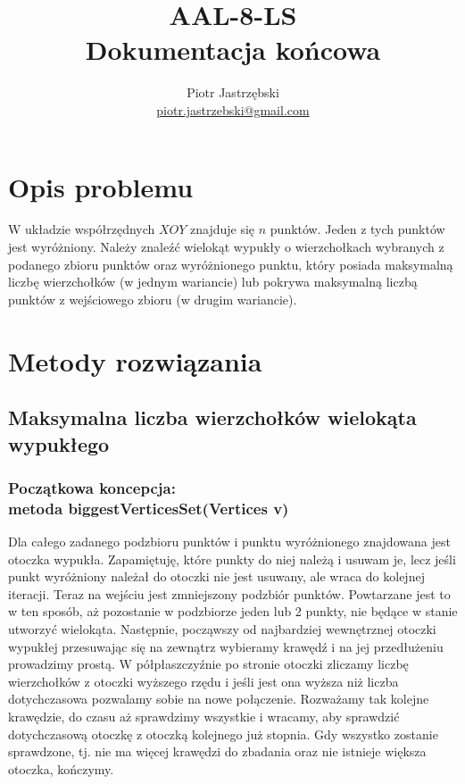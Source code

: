 \documentclass[11pt,a4paper]{article}
\title{AAL-8-LS\\ \large Dokumentacja końcowa}
\author{Piotr Jastrzębski\\ \url{piotr.jastrzebski@gmail.com}}
\date{}
\begin{document}
 
\maketitle

\section{Opis problemu}
W układzie współrzędnych $XOY$ znajduje się $n$ punktów. Jeden z tych punktów jest wyróżniony. Należy znaleźć wielokąt wypukły o wierzchołkach wybranych z podanego zbioru punktów oraz wyróżnionego punktu, który posiada maksymalną liczbę wierzchołków (w jednym wariancie) lub pokrywa maksymalną liczbą punktów z wejściowego zbioru (w drugim wariancie).

\section{Metody rozwiązania}
\subsection{Maksymalna liczba wierzchołków wielokąta wypukłego}
\subsubsection{Początkowa koncepcja: \\ metoda biggestVerticesSet(Vertices v)}
Dla całego zadanego podzbioru punktów i punktu wyróżnionego znajdowana jest otoczka wypukła. Zapamiętuję, które punkty do niej należą i usuwam je, lecz jeśli punkt wyróżniony należał do otoczki nie jest usuwany, ale wraca do kolejnej iteracji. Teraz na wejściu jest zmniejszony podzbiór punktów. Powtarzane jest to w ten sposób, aż pozostanie w podzbiorze jeden lub 2 punkty, nie będące w stanie utworzyć wielokąta. Następnie, począwszy od najbardziej wewnętrznej otoczki wypukłej przesuwając się na zewnątrz wybieramy krawędź i na jej przedłużeniu prowadzimy prostą. W półpłaszczyźnie po stronie otoczki zliczamy liczbę wierzchołków z otoczki wyższego rzędu i jeśli jest ona wyższa niż liczba dotychczasowa pozwalamy sobie na nowe połączenie. Rozważamy tak kolejne krawędzie, do czasu aż sprawdzimy wszystkie i wracamy, aby sprawdzić dotychczasową otoczkę z otoczką kolejnego już stopnia. Gdy wszystko zostanie sprawdzone, tj. nie ma więcej krawędzi do zbadania oraz nie istnieje większa otoczka, kończymy.
\end{document}
